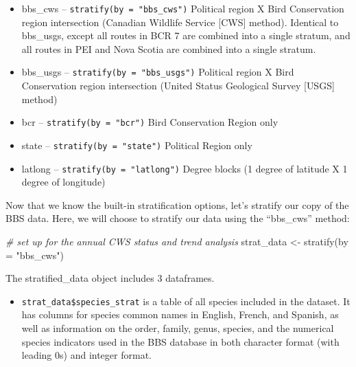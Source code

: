 \documentclass[
]{book}
\newenvironment{Shaded}{\begin{snugshade}}{\end{snugshade}}
\newcommand{\AttributeTok}[1]{\textcolor[rgb]{0.77,0.63,0.00}{#1}}
\newcommand{\CommentTok}[1]{\textcolor[rgb]{0.56,0.35,0.01}{\textit{#1}}}
\newcommand{\FunctionTok}[1]{\textcolor[rgb]{0.00,0.00,0.00}{#1}}
\newcommand{\NormalTok}[1]{#1}
\newcommand{\OtherTok}[1]{\textcolor[rgb]{0.56,0.35,0.01}{#1}}
\newcommand{\StringTok}[1]{\textcolor[rgb]{0.31,0.60,0.02}{#1}}
\providecommand{\tightlist}{%
  \setlength{\itemsep}{0pt}\setlength{\parskip}{0pt}}
\begin{document}
\begin{itemize}
\tightlist
\item
  bbs\_cws -- \texttt{stratify(by\ =\ "bbs\_cws")} Political region X Bird Conservation region intersection (Canadian Wildlife Service {[}CWS{]} method). Identical to bbs\_usgs, except all routes in BCR 7 are combined into a single stratum, and all routes in PEI and Nova Scotia are combined into a single stratum.
\end{itemize}

\begin{itemize}
\tightlist
\item
  bbs\_usgs -- \texttt{stratify(by\ =\ "bbs\_usgs")} Political region X Bird Conservation region intersection (United Status Geological Survey {[}USGS{]} method)
\end{itemize}

\begin{itemize}
\tightlist
\item
  bcr -- \texttt{stratify(by\ =\ "bcr")} Bird Conservation Region only
\end{itemize}

\begin{itemize}
\tightlist
\item
  state -- \texttt{stratify(by\ =\ "state")} Political Region only
\end{itemize}

\begin{itemize}
\tightlist
\item
  latlong -- \texttt{stratify(by\ =\ "latlong")} Degree blocks (1 degree of latitude X 1 degree of longitude)
\end{itemize}

Now that we know the built-in stratification options, let's stratify our copy of the BBS data. Here, we will choose to stratify our data using the ``bbs\_cws'' method:

\begin{Shaded}
\begin{Highlighting}[]
\CommentTok{\# set up for the annual CWS status and trend analysis}
\NormalTok{strat\_data }\OtherTok{\textless{}{-}} \FunctionTok{stratify}\NormalTok{(}\AttributeTok{by =} \StringTok{"bbs\_cws"}\NormalTok{)}
\end{Highlighting}
\end{Shaded}

The stratified\_data object includes 3 dataframes.

\begin{itemize}
\tightlist
\item
  \texttt{strat\_data\$species\_strat} is a table of all species included in the dataset. It has columns for species common names in English, French, and Spanish, as well as information on the order, family, genus, species, and the numerical species indicators used in the BBS database in both character format (with leading 0s) and integer format.
\end{itemize}
\end{document}
